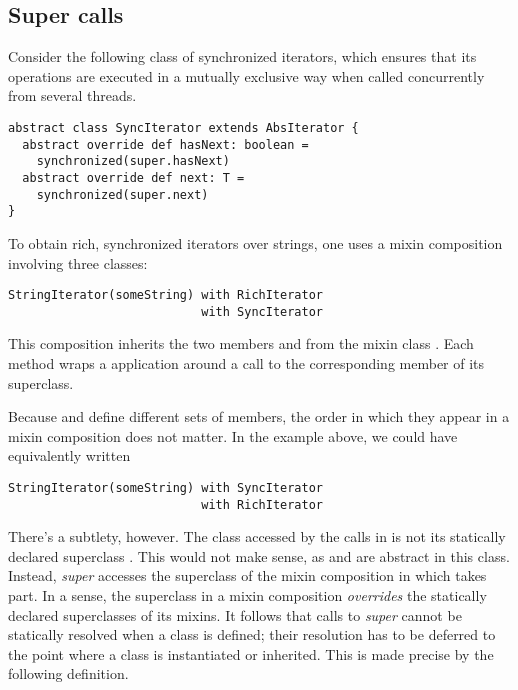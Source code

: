 \documentclass[a4paper,11pt,twoside]{article}
\begin{document}
\subsection*{Super calls}
Consider the following class of synchronized iterators, which ensures
that its operations are executed in a mutually exclusive way when
called concurrently from several threads.
\begin{lstlisting}
abstract class SyncIterator extends AbsIterator {
  abstract override def hasNext: boolean = 
    synchronized(super.hasNext)
  abstract override def next: T = 
    synchronized(super.next)
}
\end{lstlisting}
To obtain rich, synchronized iterators over strings, one uses a mixin
composition involving three classes:
\begin{lstlisting}
StringIterator(someString) with RichIterator 
                           with SyncIterator
\end{lstlisting}
This composition inherits the two members \lstinline@hasNext@ and
\lstinline@next@ from the mixin class \lstinline@SyncIterator@.  Each
method wraps a \lstinline@synchronized@ application around a call to
the corresponding member of its superclass. 

Because \lstinline@RichIterator@ and \lstinline@StringIterator@ define
different sets of members, the order in which they appear in a mixin
composition does not matter.
In the example above, we could have equivalently written
\begin{lstlisting}
StringIterator(someString) with SyncIterator 
                           with RichIterator
\end{lstlisting}
There's a subtlety, however.  The class accessed by the
 calls in \lstinline@SyncIterator@ is not its
statically declared superclass \lstinline@AbsIterator@. This would not
make sense, as \lstinline@hasNext@ and \lstinline@next@ are abstract
in this class.  Instead, {\em super} accesses the superclass
\lstinline@StringIterator@ of the mixin composition in which
\lstinline@SyncIterator@ takes part. In a sense, the superclass in a
mixin composition {\em overrides} the statically declared superclasses
of its mixins. It follows that calls to {\em super} cannot be
statically resolved when a class is defined; their resolution has to
be deferred to the point where a class is instantiated or inherited.
This is made precise by the following definition.
\end{document}
